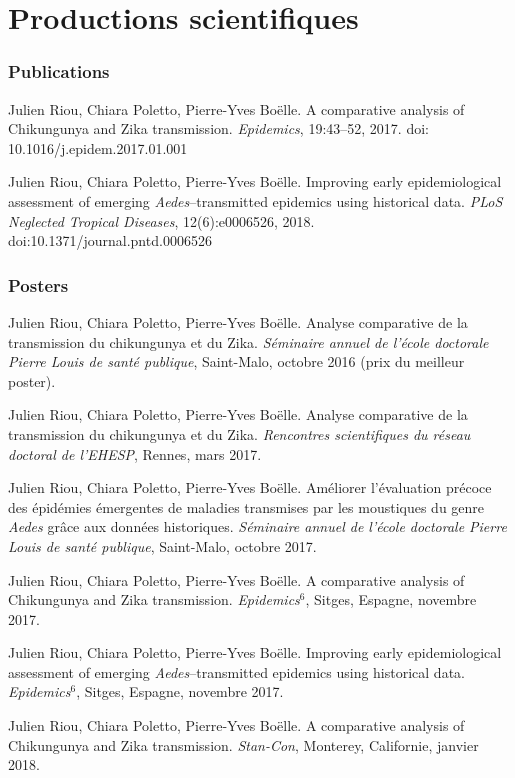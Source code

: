 \clearpage\singlespacing
\chapter*{Productions scientifiques}
\vspace{2em}

\subsection*{Publications}

\noindent Julien Riou, Chiara Poletto, Pierre-Yves Boëlle. A comparative analysis of Chikungunya and Zika transmission. {\em Epidemics}, 19:43--52, 2017. doi: 10.1016/j.epidem.2017.01.001 

\vspace{1.5em}

\noindent Julien Riou, Chiara Poletto, Pierre-Yves Boëlle. Improving early epidemiological assessment of emerging {\em Aedes}--transmitted epidemics using historical data. {\em PLoS Neglected Tropical Diseases}, 12(6):e0006526, 2018. doi:10.1371/journal.pntd.0006526


\subsection*{Posters}

\noindent Julien Riou, Chiara Poletto, Pierre-Yves Boëlle. Analyse comparative de la transmission du chikungunya et du Zika. \textit{Séminaire annuel de l'école doctorale Pierre Louis de santé publique}, Saint-Malo, octobre 2016 (prix du meilleur poster).

\vspace{1.5em}
\noindent Julien Riou, Chiara Poletto, Pierre-Yves Boëlle. Analyse comparative de la transmission du chikungunya et du Zika. \textit{Rencontres scientifiques du réseau doctoral de l'EHESP}, Rennes, mars 2017.

\vspace{1.5em}
\noindent Julien Riou, Chiara Poletto, Pierre-Yves Boëlle. Améliorer l'évaluation précoce des épidémies émergentes de maladies transmises par les moustiques du genre {\em Aedes} grâce aux données historiques. \textit{Séminaire annuel de l'école doctorale Pierre Louis de santé publique}, Saint-Malo, octobre 2017.

\vspace{1.5em}
\noindent Julien Riou, Chiara Poletto, Pierre-Yves Boëlle. A comparative analysis of Chikungunya and Zika transmission. \textit{Epidemics$^6$}, Sitges, Espagne, novembre 2017.

\vspace{1.5em}
\noindent Julien Riou, Chiara Poletto, Pierre-Yves Boëlle. Improving early epidemiological assessment of emerging {\em Aedes}--transmitted epidemics using historical data. \textit{Epidemics$^6$}, Sitges, Espagne, novembre 2017.

\vspace{1.5em}
\noindent Julien Riou, Chiara Poletto, Pierre-Yves Boëlle. A comparative analysis of Chikungunya and Zika transmission. \textit{Stan-Con}, Monterey, Californie, janvier 2018.

